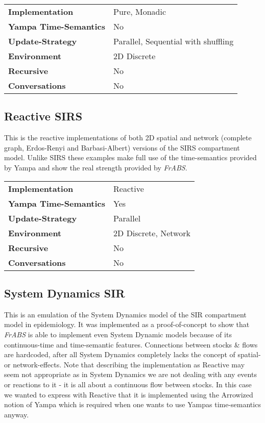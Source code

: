\begin{center}
\begin{tabular}{l || l }
\textbf{Implementation}			& Pure, Monadic \\
\textbf{Yampa Time-Semantics}	& No \\
\textbf{Update-Strategy}		& Parallel, Sequential with shuffling \\
\textbf{Environment}			& 2D Discrete \\
\textbf{Recursive}				& No \\
\textbf{Conversations}			& No \\
\end{tabular}
\end{center}

\subsection{Reactive SIRS}
This is the reactive implementations of both 2D spatial and network (complete graph, Erdos-Renyi and Barbasi-Albert) versions of the SIRS compartment model. Unlike SIRS these examples make full use of the time-semantics provided by Yampa and show the real strength provided by \textit{FrABS}.

\begin{center}
\begin{tabular}{l || l }
\textbf{Implementation}			& Reactive \\
\textbf{Yampa Time-Semantics}	& Yes \\
\textbf{Update-Strategy}		& Parallel \\
\textbf{Environment}			& 2D Discrete, Network \\
\textbf{Recursive}				& No \\
\textbf{Conversations}			& No \\
\end{tabular}
\end{center}

\subsection{System Dynamics SIR}
This is an emulation of the System Dynamics model of the SIR compartment model in epidemiology. It was implemented as a proof-of-concept to show that \textit{FrABS} is able to implement even System Dynamic models because of its continuous-time and time-semantic features. Connections between stocks \& flows are hardcoded, after all System Dynamics completely lacks the concept of spatial- or network-effects. Note that describing the implementation as Reactive may seem not appropriate as in System Dynamics we are not dealing with any events or reactions to it - it is all about a continuous flow between stocks. In this case we wanted to express with Reactive that it is implemented using the Arrowized notion of Yampa which is required when one wants to use Yampas time-semantics anyway.

